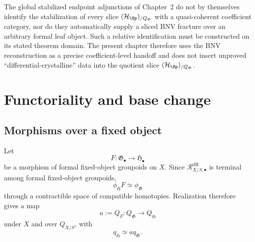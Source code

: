 \begin{remark}
The global stabilized endpoint adjunctions of Chapter~2 do not by themselves
identify the stabilization of every slice
$(\mathcal H_{\Sp})_{/Q_{\mathfrak G}}$ with a quasi-coherent
coefficient category, nor do they automatically supply a sliced BNV fracture
over an arbitrary formal leaf object.  Such a relative identification must be
constructed on its stated theorem domain.  The present chapter therefore uses
the BNV reconstruction as a precise coefficient-level handoff and does not
insert unproved ``differential-crystalline'' data into
the quotient slice $(\mathcal H_{\Sp})_{/Q_{\mathfrak G}}$.
\end{remark}


\section{Functoriality and base change}
\label{sec:flg-functoriality}

\subsection{Morphisms over a fixed object}

Let
\[
    F:\mathfrak G_\bullet\longrightarrow\mathfrak H_\bullet
\]
be a morphism of formal fixed-object groupoids on $X$.  Since
$\mathcal R^{\mathrm{dR}}_{X/S,\bullet}$ is terminal among formal fixed-object groupoids,
\[
    \phi_{\mathfrak H}F
    \simeq
    \phi_{\mathfrak G}
\]
through a contractible space of compatible homotopies.  Realization therefore gives a map
\[
    a:=Q_F:
    Q_{\mathfrak G}\longrightarrow Q_{\mathfrak H}
\]
under $X$ and over $Q_{X/S}$, with
\[
    q_{\mathfrak H}\simeq aq_{\mathfrak G}.
\]

